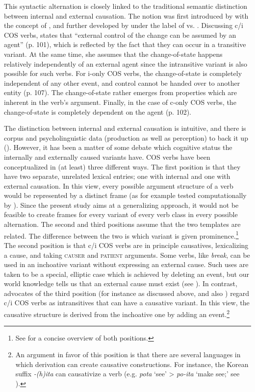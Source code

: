 \noindent This syntactic alternation is closely linked to the traditional semantic distinction between internal and external causation. The notion was first introduced by \citet{Smith.1970} with the concept of , and further developed by \citet{Levin.1995} under the label of  vs. . Discussing c/i COS verbs, \citet{Smith.1970} states that ``external control of the change can be assumed by an agent'' (p. 101), which is reflected by the fact that they can occur in a transitive variant. At the same time, she assumes that the change-of-state happens relatively independently of an external agent since the intransitive variant is also possible for such verbs. For i-only COS verbs, the change-of-state is completely independent of any other event, and control cannot be handed over to another entity (p. 107). The change-of-state rather emerges from properties which are inherent in the verb's argument. Finally, in the case of c-only COS verbs, the change-of-state is completely dependent on the agent (p. 102).  

The distinction between internal and external causation is intuitive, and there is corpus and psycholinguistic data (production as well as perception) to back it up (\citealt{McKoon.2000}). However, it has been a matter of some debate which cognitive status the internally and externally caused variants have. COS verbs have been conceptualized in (at least) three different ways.
The first position is that they have two separate, unrelated lexical entries; one with internal and one with external causation. 
In this view, every possible argument structure of a verb would be represented by a distinct frame (as for example tested computationally by \citealt{Haugereid.2011}). Since the present study aims at a generalizing approach, it would not be feasible to create frames for every variant of every verb class in every possible alternation.
The second and third positions assume that the two templates are related. The difference between the two is which variant is given prominence.\footnote{See \citet{Levin.2011b, Levin.2011a} for a concise overview of both positions.}   
The second position is that c/i COS verbs are in principle causatives, lexicalizing a cause, and taking \textsc{causer} and \textsc{patient} arguments. Some verbs, like \textit{break}, can be used in an inchoative variant without expressing an external cause. Such uses are taken to be a special, elliptic case which is achieved by deleting an event, but our world knowledge tells us that an external cause must exist (see \citealt[93]{Levin.1995}).
In contrast, advocates of the third position (for instance \citealt{Smith.1970} as discussed above, and also \citealt{Pinker.1989}) regard c/i COS verbs as intransitives that can have a causative variant. In this view, the causative structure is derived from the inchoative one by adding an event.\footnote{An argument in favor of this position is that there are several languages in which derivation can create causative constructions. For instance, the Korean suffix \textit{-(h)ita} can causativize a verb (e.g. \textit{pota} `see' > \textit{po-ita} `make see;' see \citealt{Dixon.2000}).}

